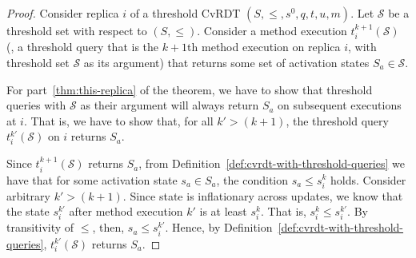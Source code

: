 \begin{proof}
Consider replica $i$ of a threshold CvRDT $(S, \leq, s^0, q, t, u,
m)$.  Let $\mathcal{S}$ be a threshold set with respect to
$(S, \leq)$.  Consider a method execution $t^{k+1}_i(\mathcal{S})$
(\ie, a threshold query that is the $k+1$th method execution
on replica $i$, with threshold set $\mathcal{S}$ as its argument) that
returns some set of activation states $S_a \in \mathcal{S}$.

For part~\ref{thm:this-replica} of the theorem, we have to show that
threshold queries with $\mathcal{S}$ as their argument will always
return $S_a$ on subsequent executions at $i$.  That is, we have to
show that, for all $k' > (k+1)$, the threshold query
$t^{k'}_i(\mathcal{S})$ on $i$ returns $S_a$.

Since $t^{k+1}_i(\mathcal{S})$ returns $S_a$, from
Definition~\ref{def:cvrdt-with-threshold-queries} we have that for
some activation state $s_a \in S_a$, the condition $s_a \leq s^k_i$
holds.  Consider arbitrary $k' > (k+1)$.  Since state is inflationary
across updates, we know that the state $s^{k'}_i$ after method
execution $k'$ is at least $s^k_i$.  That is, $s^k_i \leq s^{k'}_i$.
By transitivity of $\leq$, then, $s_a \leq s^{k'}_i$.  Hence, by
Definition~\ref{def:cvrdt-with-threshold-queries},
$t^{k'}_i(\mathcal{S})$ returns $S_a$.


\end{proof}
